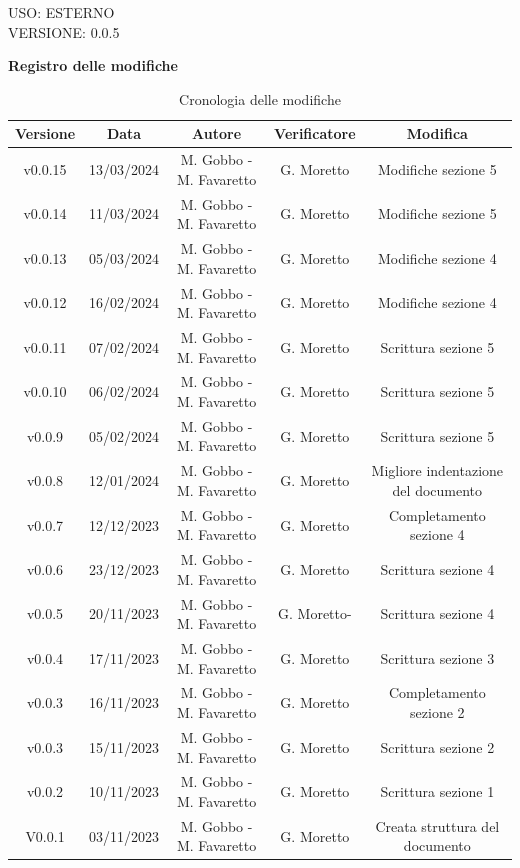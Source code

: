 \documentclass[5pt]{article}
\begin{document}
\begin{flushright}
    \begin{spacing}{1}
        USO: ESTERNO\\
        VERSIONE: 0.0.5\\
    \end{spacing}
\end{flushright}


\restoregeometry

\pagebreak

\textbf{\Large Registro delle modifiche}
\begin{table}[H]
  \centering
  \begin{tabular}{|c|c|c|c|c|}
    \hline
    \textbf{Versione} & \textbf{Data} & \textbf{Autore} & \textbf{Verificatore} & \textbf{Modifica} \\
    \hline
    v0.0.15 & 13/03/2024 & M. Gobbo - M. Favaretto & G. Moretto & Modifiche sezione 5 \\
    \hline
    v0.0.14 & 11/03/2024 & M. Gobbo - M. Favaretto & G. Moretto & Modifiche sezione 5 \\
    \hline
    v0.0.13 & 05/03/2024 & M. Gobbo - M. Favaretto & G. Moretto & Modifiche sezione 4 \\
    \hline
    v0.0.12 & 16/02/2024 & M. Gobbo - M. Favaretto & G. Moretto & Modifiche sezione 4 \\
    \hline
    v0.0.11 & 07/02/2024 & M. Gobbo - M. Favaretto & G. Moretto & Scrittura sezione 5 \\
    \hline
    v0.0.10 & 06/02/2024 & M. Gobbo - M. Favaretto & G. Moretto & Scrittura sezione 5 \\
    \hline
    v0.0.9 & 05/02/2024 & M. Gobbo - M. Favaretto & G. Moretto & Scrittura sezione 5 \\
    \hline
    v0.0.8 & 12/01/2024 & M. Gobbo - M. Favaretto & G. Moretto & Migliore indentazione del documento \\
    \hline
    v0.0.7 & 12/12/2023 & M. Gobbo - M. Favaretto & G. Moretto & Completamento sezione 4 \\
    \hline
    v0.0.6 & 23/12/2023 & M. Gobbo - M. Favaretto & G. Moretto & Scrittura sezione 4 \\
    \hline
    v0.0.5 & 20/11/2023 & M. Gobbo - M. Favaretto &G. Moretto- & Scrittura sezione 4 \\
    \hline
    v0.0.4 & 17/11/2023 & M. Gobbo - M. Favaretto & G. Moretto & Scrittura sezione 3 \\
    \hline
    v0.0.3 & 16/11/2023 & M. Gobbo - M. Favaretto & G. Moretto & Completamento sezione 2 \\
    \hline
    v0.0.3 & 15/11/2023 & M. Gobbo - M. Favaretto & G. Moretto & Scrittura sezione 2 \\
    \hline
    v0.0.2 & 10/11/2023 & M. Gobbo - M. Favaretto & G. Moretto & Scrittura sezione 1 \\
    \hline
    V0.0.1 & 03/11/2023 & M. Gobbo - M. Favaretto & G. Moretto & Creata struttura del documento \\
    \hline
  \end{tabular}
  \caption{Cronologia delle modifiche}
  \label{tab:conference}
\end{table}
\end{document}
